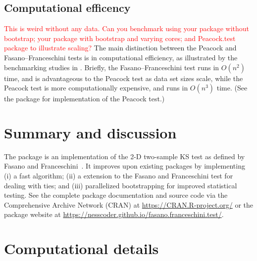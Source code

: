 \documentclass[codesnippet]{jss}
\newcommand{\RBnote}[1]{\textcolor{red}{#1}}
\begin{document}
\subsection{Computational efficency}
\RBnote{This is weird without any data.  Can you benchmark using your package without bootstrap; your package with bootstrap and varying cores; and Peacock.test package to illustrate scaling?}
The main distinction between the Peacock and Fasano--Franceschini tests is in computational efficiency, as
illustrated by the benchmarking studies in \cite{Lopes2007}.  Briefly,
the Fasano--Franceschini test runs in $O(n^2)$ time, and is advantageous to the Peacock test as data set sizes scale, while the Peacock test is more computationally expensive, and runs in $O(n^3)$ time.
%
(See the  package for  implementation of the Peacock test.)



\section{Summary and discussion} \label{sec:summary}

The  package is an  implementation of the 2-D two-sample KS test as defined by Fasano and Franceschini~\citep{Fasano1987}.
It improves upon existing packages by implementing
  (i) a fast algorithm;
  (ii) a extension to the Fasano and Franceschini test for dealing with ties; and
  (iii) parallelized bootstrapping for improved statistical testing.
  See the complete package documentation and source code via the Comprehensive
 Archive Network (CRAN) at
\url{https://CRAN.R-project.org/} or the package website at \url{https://nesscoder.github.io/fasano.franceschini.test/}.



\section*{Computational details}
\end{document}
